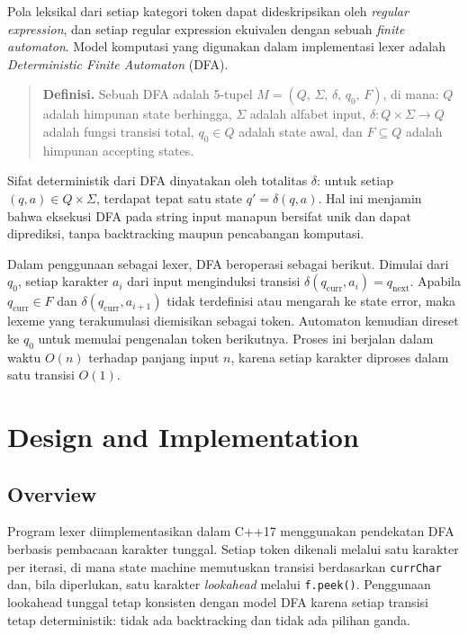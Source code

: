 \documentclass[11pt,a4paper]{article}
\begin{document}
Pola leksikal dari setiap kategori token dapat dideskripsikan oleh \textit{regular expression},
dan setiap regular expression ekuivalen dengan sebuah \textit{finite automaton}.
Model komputasi yang digunakan dalam implementasi lexer adalah
\textit{Deterministic Finite Automaton} (DFA).

\begin{quote}
\textbf{Definisi.}
Sebuah DFA adalah 5-tupel $M = (Q,\, \Sigma,\, \delta,\, q_0,\, F)$, di mana:
$Q$ adalah himpunan state berhingga,
$\Sigma$ adalah alfabet input,
$\delta : Q \times \Sigma \to Q$ adalah fungsi transisi total,
$q_0 \in Q$ adalah state awal, dan
$F \subseteq Q$ adalah himpunan accepting states.
\end{quote}

Sifat deterministik dari DFA dinyatakan oleh totalitas $\delta$: untuk setiap
$(q, a) \in Q \times \Sigma$, terdapat tepat satu state $q' = \delta(q, a)$.
Hal ini menjamin bahwa eksekusi DFA pada string input manapun bersifat unik dan dapat
diprediksi, tanpa backtracking maupun pencabangan komputasi.

Dalam penggunaan sebagai lexer, DFA beroperasi sebagai berikut. Dimulai dari $q_0$,
setiap karakter $a_i$ dari input menginduksi transisi $\delta(q_{\text{curr}}, a_i) = q_{\text{next}}$.
Apabila $q_{\text{curr}} \in F$ dan $\delta(q_{\text{curr}}, a_{i+1})$ tidak terdefinisi
atau mengarah ke state error, maka lexeme yang terakumulasi diemisikan sebagai token.
Automaton kemudian direset ke $q_0$ untuk memulai pengenalan token berikutnya.
Proses ini berjalan dalam waktu $O(n)$ terhadap panjang input $n$, karena setiap
karakter diproses dalam satu transisi $O(1)$.

\section{Design and Implementation}

\subsection{Overview}

Program lexer diimplementasikan dalam C++17 menggunakan pendekatan DFA berbasis
pembacaan karakter tunggal. Setiap token dikenali melalui satu karakter per iterasi,
di mana state machine memutuskan transisi berdasarkan \texttt{currChar} dan, bila
diperlukan, satu karakter \textit{lookahead} melalui \texttt{f.peek()}.
Penggunaan lookahead tunggal tetap konsisten dengan model DFA karena setiap
transisi tetap deterministik: tidak ada backtracking dan tidak ada pilihan ganda.
\end{document}
